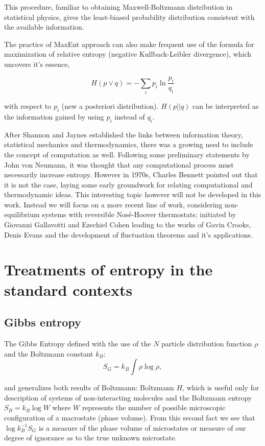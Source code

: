 \documentclass[a4paper,12pt]{article}
\begin{document}
This procedure, familiar to obtaining Maxwell-Boltzmann distribution in statistical physics, gives the least-biased probability distribution consistent with the available information.

The practice of MaxEnt approach can also make frequent use of the formula for maximization of relative entropy (negative Kullback-Leibler divergence), which uncovers it's essence,

\begin{equation}
\label{Kullback-Leibler}
    H(p\lor q) = -\sum_i p_i \ln \frac{p_i}{q_i}
\end{equation}


with respect to $p_i$ (new a posteriori distribution). $H(p||q)$ can be interpreted as the information gained by using $p_i$ instead of $q_i$.


After Shannon and Jaynes established the links between information theory, statistical mechanics and thermodynamics, there was a growing need to include the concept of computation as well. Following some preliminary statements by John von Neumann, it was thought that any computational process must necessarily increase entropy.
However in 1970s, Charles Bennett pointed out that it is not the case\cite{Bennett:1973ko}, laying some early groundwork for relating computational and thermodynamic ideas. This interesting topic however will not be developed in this work. Instead we will focus on a more recent line of work, considering non-equilibrium systems with reversible Nosé-Hoover thermostats; initiated by Giovanni Gallavotti and Ezechiel Cohen \cite{Gallavotti:1995gy} leading to the works of Gavin Crooks\cite{Crooks:2008ta}, Denis Evans and the development of fluctuation theorems and it's applications.

\section{Treatments of entropy in the standard contexts}

\subsection{Gibbs entropy}
\label{Gibbs entropy}
The Gibbs Entropy defined with the use of the $N$ particle distribution function $ \rho $ and the Boltzmann constant $k_B$:
\begin{equation}
  S_G = k_B \int \rho \log{\rho},
\end{equation}

and generalizes both results of Boltzmann:
Boltzmann $H$, which is useful only for description of systems of non-interacting molecules\cite{Jaynes:1965gg} and the Boltzmann entropy $S_B = k_B \log{W}$ where $W$ represents the number of possible microscopic configuration of a macrostate (phase volume). 
From this second fact we see that $\log{k_B^{-1} S_G}$ is a measure of the phase volume of microstates or measure of our degree of ignorance as to the true unknown microstate.
\end{document}
